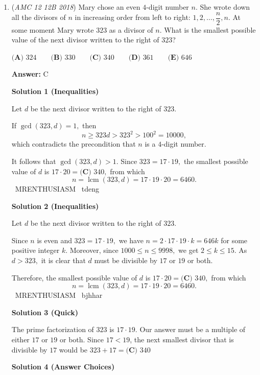 \begin{enumerate}
 


	\item (\textit{AMC 12 12B 2018}) Mary chose an even $4$-digit number $n$. She wrote down all the divisors of $n$ in increasing order from left to right: $1,2,\ldots,\dfrac{n}{2},n$. At some moment Mary wrote $323$ as a divisor of $n$. What is the smallest possible value of the next divisor written to the right of $323$?


 $\textbf{(A) } 324 \qquad \textbf{(B) } 330 \qquad \textbf{(C) } 340 \qquad \textbf{(D) } 361 \qquad \textbf{(E) } 646$

 \textbf{Answer: }C



\textbf{Solution 1 (Inequalities)}

Let $d$ be the next divisor written to the right of $323.$

 If $\gcd(323,d)=1,$ then 
 \[n\geq323d>323^2>100^2=10000,\] which contradicts the precondition that $n$ is a $4$-digit number.

 It follows that $\gcd(323,d)>1.$ Since $323=17\cdot19,$ the smallest possible value of $d$ is $17\cdot20=\boxed{\textbf{(C) } 340},$ from which 
 \[n=\operatorname{lcm}(323,d)=17\cdot19\cdot20=6460.\]~MRENTHUSIASM ~tdeng

 



\textbf{Solution 2 (Inequalities)}

Let $d$ be the next divisor written to the right of $323.$

 Since $n$ is even and $323=17\cdot19,$ we have $n=2\cdot17\cdot19\cdot k=646k$ for some positive integer $k.$ Moreover, since $1000\leq n\leq9998,$ we get $2\leq k\leq15.$ As $d>323,$ it is clear that $d$ must be divisible by $17$ or $19$ or both.

 Therefore, the smallest possible value of $d$ is $17\cdot20=\boxed{\textbf{(C) } 340},$ from which 
 \[n=\operatorname{lcm}(323,d)=17\cdot19\cdot20=6460.\]~MRENTHUSIASM ~bjhhar

 



\textbf{Solution 3 (Quick)}

The prime factorization of $323$ is $17 \cdot 19$. Our answer must be a multiple of either $17$ or $19$ or both. Since $17 < 19$, the next smallest divisor that is divisible by $17$ would be $323 + 17 = \boxed{\textbf{(C) } 340}$




\textbf{Solution 4 (Answer Choices)}


\end{enumerate}
